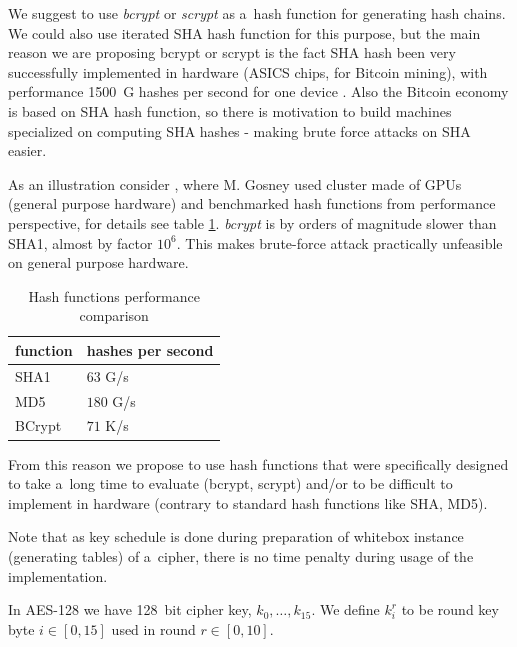 \documentclass[11pt,oneside,final]{fithesis2}
\begin{document}
    We suggest to use \emph{bcrypt} \citep{Provos99afuture-adaptable} or \emph{scrypt} \citep{Percival_strongerkey} as a~hash function for generating hash chains. 
    We could also use iterated SHA hash function for this purpose, but the main reason we are proposing bcrypt or scrypt is the fact SHA hash been
    very successfully implemented in hardware (ASICS chips, for Bitcoin mining), with performance 1500~G hashes per second for one device \cite{shamining_web}.
    Also the Bitcoin economy is based on SHA hash function, so there is motivation to build machines specialized on computing SHA hashes - making
    brute force attacks on SHA easier.

    As an illustration consider \cite{bcrypthash}, where M. Gosney used cluster made of GPUs (general purpose hardware) and benchmarked hash functions from performance perspective, for
    details see table \ref{tbl:hash_performance}. \emph{bcrypt} is by orders of magnitude slower than SHA1, almost by factor $10^6$. This makes brute-force
    attack practically unfeasible on general purpose hardware. 

    \begin{table}
    \begin{center}
    \begin{tabular}{ | l | l | }
 	\hline    
	function & hashes per second \\ \hline
	SHA1     & $63$ G/s \\ \hline
	MD5      & $180$ G/s \\ \hline
	BCrypt   & $71$ K/s \\   \hline
    \end{tabular}
    \caption{Hash functions performance comparison}
    \label{tbl:hash_performance}
    \end{center} 
    \end{table}

    From this reason we propose to use hash functions that were specifically designed to take a~long time to evaluate (bcrypt, scrypt) 
    and/or to be difficult to implement in hardware (contrary to standard hash functions like SHA, MD5).

    Note that as key schedule is done during preparation of whitebox instance (generating tables) of a~cipher, there is no time penalty during 
    usage of the implementation.
        
    In AES-128 we have 128~bit cipher key, $k_0,\dots,k_{15}$. We define $k_i^r$ to be round key byte $i \in [0,15]$ used in round $r \in [0,10]$.
    
\end{document}
